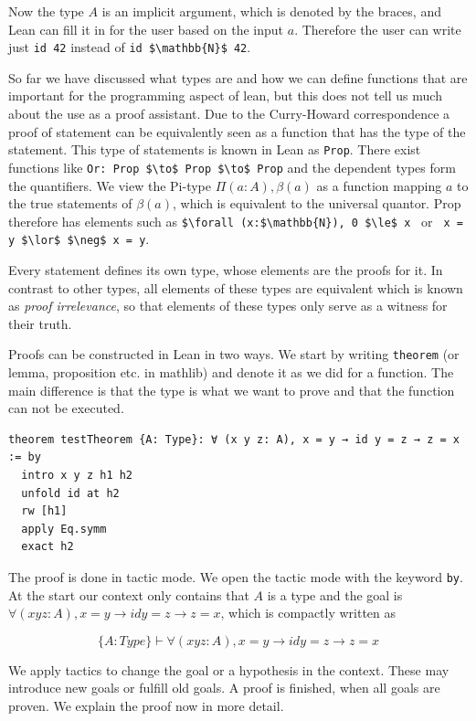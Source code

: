 Now the type $A$ is an implicit argument, which is denoted by the braces, and Lean can fill it in for the user based on the input $a$. Therefore the user can write just \lstinline|id 42| instead of \lstinline|id $\mathbb{N}$ 42|.

So far we have discussed what types are and how we can define functions that are important for the programming aspect of lean, but this does not tell us much about the use as a proof assistant. Due to the Curry-Howard correspondence a proof of statement can be equivalently seen as a function that has the type of the statement. This type of statements is known in Lean as \lstinline|Prop|. There exist functions like \lstinline|Or: Prop $\to$ Prop $\to$ Prop| and the dependent types form the quantifiers. We view the Pi-type $\Pi (a:A), \beta(a)$ as a function mapping $a$ to the true statements of $\beta(a)$, which is equivalent to the universal quantor. Prop therefore has elements such as \lstinline|$\forall (x:$\mathbb{N}), 0 $\le$ x | or \lstinline| x = y $\lor$ $\neg$ x = y|.

Every statement defines its own type, whose elements are the proofs for it. In contrast to other types, all elements of these types are equivalent which is known as \textit{proof irrelevance}, so that elements of these types only serve as a witness for their truth.

Proofs can be constructed in Lean in two ways.  We start by writing \lstinline|theorem| (or lemma, proposition etc. in mathlib) and denote it as we did for a function. The main difference is that the type is what we want to prove and that the function can not be executed.

\begin{lstlisting}
theorem testTheorem {A: Type}: ∀ (x y z: A), x = y → id y = z → z = x := by
  intro x y z h1 h2
  unfold id at h2
  rw [h1]
  apply Eq.symm
  exact h2
\end{lstlisting}

The proof is done in tactic mode. We open the tactic mode with the keyword \lstinline|by|. At the start our context only contains that $A$ is a type and the goal is $∀ (x y z: A), x = y → id y = z → z = x$, which is compactly written as

\[ \{A:Type\} \vdash ∀ (x y z: A), x = y → id y = z → z = x\]

We apply tactics to change the goal or a hypothesis in the context. These may introduce new goals or fulfill old goals. A proof is finished, when all goals are proven. We explain the proof now in more detail.

